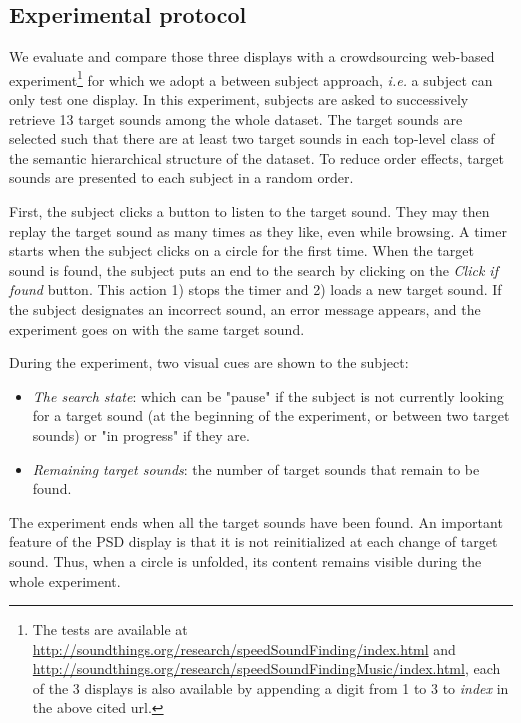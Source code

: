 \documentclass{aes2e}
\begin{document}
\subsection{Experimental protocol}

We evaluate and compare those three displays with a crowdsourcing web-based experiment\footnote{The tests are available at \url{http://soundthings.org/research/speedSoundFinding/index.html} and \url{http://soundthings.org/research/speedSoundFindingMusic/index.html}, each of the 3 displays is also available by appending a digit from 1 to 3 to \textit{index} in the above cited url.} for which we adopt a between subject approach, \textit{i.e.} a subject can only test one display. In this experiment, subjects are asked to successively retrieve 13 target sounds among the whole dataset. The target sounds are selected such that there are at least two target sounds in each top-level class of the semantic hierarchical structure of the dataset. To reduce order effects, target sounds are presented to each subject in a random order.

First, the subject clicks a button to listen to the target sound. They may then replay the target sound as many times as they like, even while browsing. A timer starts when the subject clicks on a circle for the first time. When the target sound is found, the subject puts an end to the search by clicking on the \textit{Click if found} button. This action 1) stops the timer and 2) loads a new target sound. If the subject designates an incorrect sound, an error message appears, and the experiment goes on with the same target sound.


During the experiment, two visual cues are shown to the subject:
\begin{itemize}
\item \textit{The search state}: which can be "pause" if the subject is not currently looking for a target sound (at the beginning of the experiment, or between two target sounds) or  "in progress"  if they are.
\item \textit{Remaining target sounds}: the number of target sounds that remain to be found.
\end{itemize}

The experiment ends when all the target sounds have been found. An important feature of the PSD display is that it is not reinitialized at each change of target sound. Thus, when a circle is unfolded, its content remains visible during the whole experiment.
\end{document}

